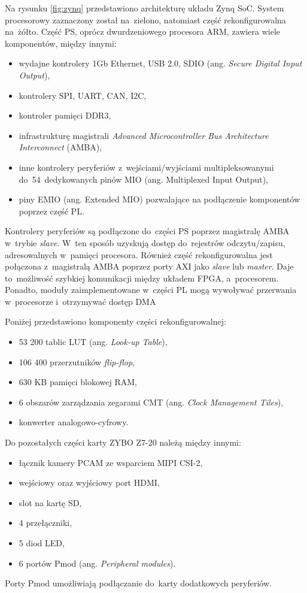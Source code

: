 Na rysunku \ref{fig:zynq} przedstawiono architekturę układu Zynq SoC. 
System procesorowy zaznaczony został na~zielono, natomiast część rekonfigurowalna na~żółto. 
Część PS, oprócz dwurdzeniowego procesora ARM, zawiera wiele komponentów, między innymi:
\begin{itemize}
	\item wydajne kontrolery 1Gb Ethernet, USB 2.0, SDIO (ang. \textit{Secure Digital Input Output}),
	\item kontrolery SPI, UART, CAN, I2C,
	\item kontroler pamięci DDR3,
	\item infrastrukturę magistrali \textit{Advanced Microcontroller Bus Architecture Interconnect} (AMBA),
	\item inne kontrolery peryferiów z~wejściami/wyjściami multipleksowanymi do~54~dedykowanych pinów MIO (ang. Multiplexed Input Output),
	\item piny EMIO (ang. Extended MIO) pozwalające na podłączenie komponentów poprzez część PL.
\end{itemize}

Kontrolery peryferiów są podłączone do~części PS poprzez magistralę AMBA w~trybie \textit{slave}. 
W~ten sposób uzyskują dostęp do~rejestrów odczytu/zapisu, adresowalnych w~pamięci procesora. 
Również część rekonfigurowalna jest połączona z~magistralą AMBA poprzez porty AXI jako \textit{slave} lub \textit{master}. 
Daje to~możliwość szybkiej komunikacji między układem FPGA, a~procesorem. 
Ponadto, moduły zaimplementowane w~części PL mogą wywoływać przerwania w~procesorze i~otrzymywać dostęp DMA 


Poniżej przedstawiono komponenty części rekonfigurowalnej:
\begin{itemize}
	\item 53 200 tablic LUT (ang. \textit{Look-up Table}),
	\item 106 400 przerzutników \textit{flip-flop},
	\item 630 KB pamięci blokowej RAM,
	\item 6 obszarów zarządzania zegarami CMT (ang. \textit{Clock Management Tiles}),
	\item konwerter analogowo-cyfrowy.
\end{itemize}
Do pozostałych części karty ZYBO Z7-20 należą między innymi:
\begin{itemize}
	\item łącznik kamery PCAM ze wsparciem MIPI CSI-2,
	\item wejściowy oraz wyjściowy port HDMI,
	\item slot na kartę SD,
	\item 4 przełączniki,
	\item 5 diod LED,
	\item 6 portów Pmod (ang. \textit{Peripheral modules}).
\end{itemize}
Porty Pmod umożliwiają podłączanie do~karty dodatkowych peryferiów.

